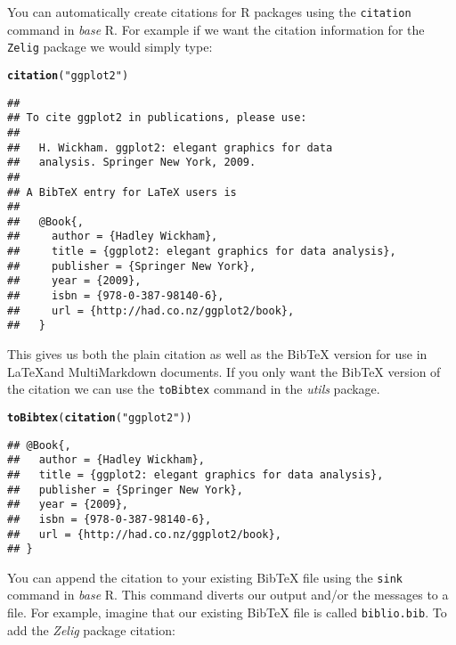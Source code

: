 \documentclass[ChapterTOCs,krantz1]{krantz}\usepackage{graphicx, color}
\makeatletter
\newcommand{\hlfunctioncall}[1]{\textcolor[rgb]{0.501960784313725,0,0.329411764705882}{\textbf{#1}}}%
\newcommand{\hlstring}[1]{\textcolor[rgb]{0.6,0.6,1}{#1}}%
\newenvironment{kframe}{%
 \def\at@end@of@kframe{}%
 \ifinner\ifhmode%
  \def\at@end@of@kframe{\end{minipage}}%
  \begin{minipage}{\columnwidth}%
 \fi\fi%
 \def\FrameCommand##1{\hskip\@totalleftmargin \hskip-\fboxsep
 \colorbox{shadecolor}{##1}\hskip-\fboxsep
     \hskip-\linewidth \hskip-\@totalleftmargin \hskip\columnwidth}%
 \MakeFramed {\advance\hsize-\width
   \@totalleftmargin\z@ \linewidth\hsize
   \@setminipage}}%
 {\par\unskip\endMakeFramed%
 \at@end@of@kframe}
\newenvironment{knitrout}{}{} %
\makeatother
\begin{document}
You can automatically create citations for R packages using the \texttt{citation} command in \emph{base} R. For example if we want the citation information for the \texttt{Zelig} package we would simply type:

\begin{knitrout}
\color{fgcolor}\begin{kframe}
\begin{alltt}
\hlfunctioncall{citation}(\hlstring{"ggplot2"})
\end{alltt}
\begin{verbatim}
## 
## To cite ggplot2 in publications, please use:
## 
##   H. Wickham. ggplot2: elegant graphics for data
##   analysis. Springer New York, 2009.
## 
## A BibTeX entry for LaTeX users is
## 
##   @Book{,
##     author = {Hadley Wickham},
##     title = {ggplot2: elegant graphics for data analysis},
##     publisher = {Springer New York},
##     year = {2009},
##     isbn = {978-0-387-98140-6},
##     url = {http://had.co.nz/ggplot2/book},
##   }
\end{verbatim}
\end{kframe}
\end{knitrout}


\noindent This gives us both the plain citation as well as the BibTeX version for use in \LaTeX and MultiMarkdown documents. If you only want the BibTeX version of the citation we can use the \texttt{toBibtex} command in the \emph{utils} package.

\begin{knitrout}
\color{fgcolor}\begin{kframe}
\begin{alltt}
\hlfunctioncall{toBibtex}(\hlfunctioncall{citation}(\hlstring{"ggplot2"}))
\end{alltt}
\begin{verbatim}
## @Book{,
##   author = {Hadley Wickham},
##   title = {ggplot2: elegant graphics for data analysis},
##   publisher = {Springer New York},
##   year = {2009},
##   isbn = {978-0-387-98140-6},
##   url = {http://had.co.nz/ggplot2/book},
## }
\end{verbatim}
\end{kframe}
\end{knitrout}


\noindent You can append the citation to your existing BibTeX file using the \texttt{sink} command in \emph{base} R. This command diverts our output and/or the messages to a file. For example, imagine that our existing BibTeX file is called \texttt{biblio.bib}. To add the \emph{Zelig} package citation:
\end{document}
